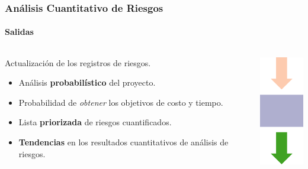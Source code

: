 \frame
{
\frametitle{Análisis Cuantitativo de Riesgos}
\framesubtitle{Salidas}
\begin{columns}
	\begin{column}{0.8\textwidth}
		Actualización de los registros de riesgos.
		\begin{itemize}
			\item<1-> Análisis \textbf{probabilístico} del proyecto.
			\item<2-> Probabilidad de \emph{obtener} los objetivos de costo y tiempo.
			\item<3-> Lista \textbf{priorizada} de riesgos cuantificados.
			\item<4-> \textbf{Tendencias} en los resultados cuantitativos de análisis de riesgos.
		\end{itemize}
	\end{column}
	\begin{column}{0.2\textwidth}
		\includegraphics[width=2cm]{img/output}
	\end{column}
\end{columns}
}


